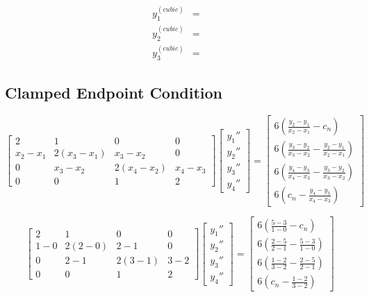 \documentclass[11pt]{article} %
\begin{document}
$$\begin{array}{lclcl} y^{(cubic)}_1 & = &  \\
		        y^{(cubic)}_2  & = &  \\
		        y^{(cubic)}_3  & = & 
\end{array}$$

\subsection*{Clamped Endpoint Condition}
$$\begin{bmatrix} 2 & 1 & 0 & 0 \\ x_2 - x_1 & 2(x_3 - x_1) & x_3 - x_2 & 0 
		 \\ 0 & x_3 - x_2 & 2(x_4 - x_2) & x_4 - x_3 \\ 0 & 0 & 1 & 2
\end{bmatrix}
\begin{bmatrix} y_1'' \\ y_2'' \\ y_3'' \\ y_4'' \end{bmatrix} = 
\begin{bmatrix} 6\left(  \frac{y_2-y_1}{x_2 - x_1} -c_n  \right)\\ 6\left( \frac{y_3 - y_2}{x_3 - x_2} - \frac{y_2-y_1}{x_2 - x_1} \right) \\ 
			 6\left( \frac{y_4 - y_3}{x_4 - x_3} - \frac{y_3-y_2}{x_3 - x_2} \right) \\  6\left( c_n - \frac{y_4 - y_3}{x_4 - x_3} \right)\end{bmatrix}$$

$$\begin{bmatrix} 2 & 1 & 0 & 0 \\ 1 - 0 & 2(2 -0) &2 -1 & 0 
		 \\ 0 & 2 - 1 & 2(3 -1) & 3 - 2 \\ 0 & 0 & 1 & 2
\end{bmatrix}
\begin{bmatrix} y_1'' \\ y_2'' \\ y_3'' \\ y_4'' \end{bmatrix} = 
\begin{bmatrix} 6\left(  \frac{5-3}{1-0} -c_n  \right)\\  6\left( \frac{2 - 5}{2 - 1} - \frac{5-3}{1 - 0} \right) \\ 
			 6\left( \frac{1 - 2}{3 - 2} - \frac{2-5}{2 - 1} \right) \\  6\left( c_n -  \frac{1 - 2}{3 - 2} \right)\end{bmatrix}$$
\end{document}
